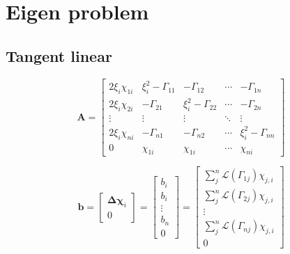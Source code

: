 %
\section{Eigen problem}
\label{sec:eigen_problem}


\subsection{Tangent linear}
\label{sec:eigen_problem-tangent_linear}

\begin{equation}
\mathbf{A} =
\left[
\begin{array}{ccccc}
2\xi_{i}\chi_{1i}  &  \xi^{2}_{i}-\Gamma_{11} &            -\Gamma_{12} & \cdots &            -\Gamma_{1n} \\
2\xi_{i}\chi_{2i}  &             -\Gamma_{21} & \xi^{2}_{i}-\Gamma_{22} & \cdots &            -\Gamma_{2n} \\
\vdots             &  \vdots                  & \vdots                  & \ddots & \vdots                  \\
 2\xi_{i}\chi_{ni} &             -\Gamma_{n1} &            -\Gamma_{n2} & \cdots & \xi^{2}_{i}-\Gamma_{nn} \\
0                  &  \chi_{1i}               & \chi_{1i}               & \cdots & \chi_{ni}
\end{array}
\right]
\label{eq:eigen_problem-tangent_linear-A}
\end{equation}

\begin{equation}
\mathbf{b} =
\left[
\begin{array}{ccccc}
\boldsymbol{\Delta}\boldsymbol{\chi}_{i}  \\
0
\end{array}
\right] =
\left[
\begin{array}{ccccc}
b_{i}  \\
b_{i}  \\
\vdots \\
b_{n}  \\
0
\end{array}
\right] =
\left[
\begin{array}{ccccc}
\sum_{j}^{n} \mathcal{L}(\Gamma_{1j})\chi_{j,i}  \\
\sum_{j}^{n} \mathcal{L}(\Gamma_{2j})\chi_{j,i}  \\
\vdots \\
\sum_{j}^{n} \mathcal{L}(\Gamma_{nj})\chi_{j,i}  \\
0
\end{array}
\right]
\label{eq:eigen_problem-tangent_linear-b}
\end{equation}

